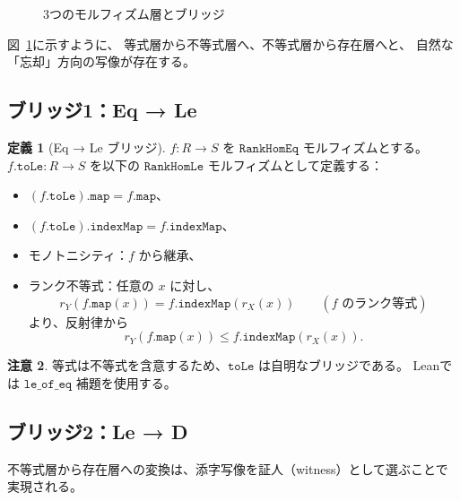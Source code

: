 \documentclass[11pt,a4paper,ja=standard]{bxjsarticle}
\theoremstyle{definition}
\newtheorem{definition}{定義}[section]
\newtheorem{remark}[definition]{注意}
\newcommand{\RankHomLe}{\mathtt{RankHomLe}}
\newcommand{\RankHomEq}{\mathtt{RankHomEq}}
\newcommand{\RankHomD}{\mathtt{RankHomD}}
\begin{document}
\begin{figure}[h]
\centering
{}
\caption{3つのモルフィズム層とブリッジ}
\label{fig:bridges}
\end{figure}

図~\ref{fig:bridges}に示すように、
等式層から不等式層へ、不等式層から存在層へと、
自然な「忘却」方向の写像が存在する。

\subsection{ブリッジ1：Eq → Le}

\begin{definition}[Eq → Le ブリッジ]\label{def:eq-to-le}
$f : R \to S$ を $\RankHomEq$ モルフィズムとする。
$f.\mathtt{toLe} : R \to S$ を以下の $\RankHomLe$ モルフィズムとして定義する：
\begin{itemize}
\item $(f.\mathtt{toLe}).\mathtt{map} = f.\mathtt{map}$、
\item $(f.\mathtt{toLe}).\mathtt{indexMap} = f.\mathtt{indexMap}$、
\item モノトニシティ：$f$ から継承、
\item ランク不等式：任意の $x$ に対し、
\[
  r_Y(f.\mathtt{map}(x))
  = f.\mathtt{indexMap}(r_X(x))
  \qquad (\text{$f$ のランク等式})
\]
より、反射律から
\[
  r_Y(f.\mathtt{map}(x)) \le f.\mathtt{indexMap}(r_X(x)).
\]
\end{itemize}
\end{definition}

\begin{remark}
等式は不等式を含意するため、$\mathtt{toLe}$ は自明なブリッジである。
Leanでは $\mathtt{le\_of\_eq}$ 補題を使用する。
\end{remark}

\subsection{ブリッジ2：Le → D}

不等式層から存在層への変換は、添字写像を証人（witness）として選ぶことで実現される。
\end{document}
